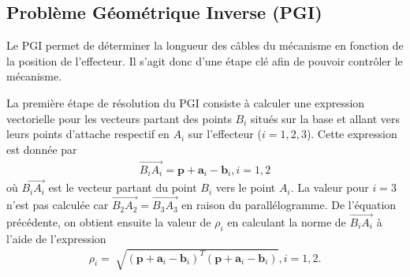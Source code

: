 \subsection{Problème Géométrique Inverse (PGI)}
Le PGI permet de déterminer la longueur des câbles du mécanisme en fonction de la position de l'effecteur. Il s'agit donc d'une étape clé afin de pouvoir contrôler le mécanisme. \par
La première étape de résolution du PGI consiste à calculer une expression vectorielle pour les vecteurs partant des points $B_i$ situés sur la base et allant vers leurs points d'attache respectif en $A_i$ sur l'effecteur ($i = 1,2,3$). Cette expression est donnée par   
\begin{align}
\overrightarrow{B_iA_i}=\mathbf{p} + \mathbf{a}_i-\mathbf{b}_i,i=1,2
\end{align}
où $\overrightarrow{B_iA_i}$ est le vecteur partant du point $B_i$ vers le point $A_i$. La valeur pour $i=3$ n'est pas calculée car $\overrightarrow{B_2A_2}=\overrightarrow{B_3A_3}$ en raison du parallélogramme. De l'équation précédente, on obtient ensuite la valeur de $\rho_i$ en calculant la norme de $\overrightarrow{B_iA_i}$ à l'aide de l'expression
\begin{align}
\rho_i = \sqrt[]{\left(\mathbf{p} + \mathbf{a}_i-\mathbf{b}_i\right)^T\left(\mathbf{p} + \mathbf{a}_i-\mathbf{b}_i\right)},i=1,2.
\label{chap1:eq:PGI}
\end{align}
